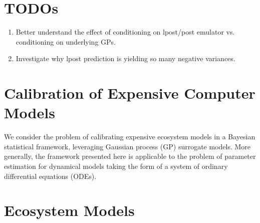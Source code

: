 \documentclass[12pt]{article}
\begin{document}
\section{TODOs}
\begin{enumerate}
\item Better understand the effect of conditioning on lpost/post emulator vs. conditioning on underlying GPs. 
\item Investigate why lpost prediction is yielding so many negative variances. 
\end{enumerate}






















\section{Calibration of Expensive Computer Models}
We consider the problem of calibrating expensive ecosystem models in a Bayesian statistical framework, leveraging 
Gaussian process (GP) surrogate models. More generally, the framework presented here is applicable to the problem of parameter 
estimation for dynamical models taking the form of a system of ordinary differential equations (ODEs). 

\section{Ecosystem Models}
\end{document}
